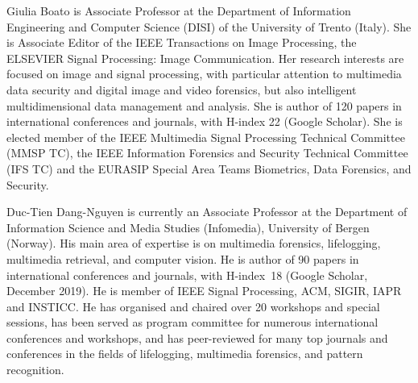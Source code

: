 \documentclass{ieeeaccess}
\begin{document}
\begin{IEEEbiography}{Giulia Boato} is Associate Professor at the Department of Information Engineering and Computer Science (DISI) of the University of Trento (Italy). She is Associate Editor of the IEEE Transactions on Image Processing, the ELSEVIER Signal Processing: Image Communication. Her research interests are focused on image and signal processing, with particular attention to multimedia data security and digital image and video forensics, but also intelligent multidimensional data management and analysis. She is author of 120 papers in international conferences and journals, with H-index 22 (Google Scholar). She is elected member of the IEEE Multimedia Signal Processing Technical Committee (MMSP TC), the IEEE Information Forensics and Security Technical Committee (IFS TC) and the EURASIP Special Area Teams Biometrics, Data Forensics, and Security.
\end{IEEEbiography}

\begin{IEEEbiography}{Duc-Tien Dang-Nguyen} is currently an Associate Professor at the Department of Information Science and Media Studies (Infomedia), University of Bergen (Norway). His main area of expertise is on multimedia forensics, lifelogging, multimedia retrieval, and computer vision. 
%
He is author of 90 papers in international conferences and journals, with H-index~18 (Google Scholar, December 2019). He is member of IEEE Signal Processing, ACM, SIGIR, IAPR and INSTICC.  
He has organised and chaired over 20 workshops and special sessions, has been served as program committee for numerous international conferences and workshops, and has peer-reviewed for many top journals and conferences in the fields of lifelogging, multimedia forensics, and pattern recognition.  
\end{IEEEbiography}
\end{document}

